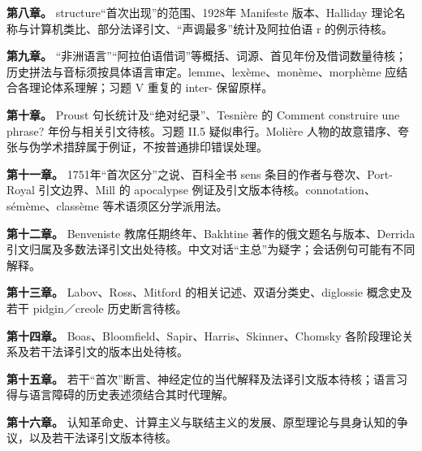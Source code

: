 \textbf{第八章。} structure“首次出现”的范围、1928年 Manifeste 版本、Halliday 理论名称与计算机类比、部分法译引文、“声调最多”统计及阿拉伯语 r 的例示待核。

\textbf{第九章。} “非洲语言”“阿拉伯语借词”等概括、词源、首见年份及借词数量待核；历史拼法与音标须按具体语言审定。lemme、lexème、monème、morphème 应结合各理论体系理解；习题 V 重复的 inter- 保留原样。

\textbf{第十章。} Proust 句长统计及“绝对纪录”、Tesnière 的 Comment construire une phrase? 年份与相关引文待核。习题 II.5 疑似串行。Molière 人物的故意错序、夸张与伪学术措辞属于例证，不按普通排印错误处理。

\textbf{第十一章。} 1751年“首次区分”之说、百科全书 sens 条目的作者与卷次、Port-Royal 引文边界、Mill 的 apocalypse 例证及引文版本待核。connotation、sémème、classème 等术语须区分学派用法。

\textbf{第十二章。} Benveniste 教席任期终年、Bakhtine 著作的俄文题名与版本、Derrida 引文归属及多数法译引文出处待核。中文对话“主总”为疑字；会话例句可能有不同解释。

\textbf{第十三章。} Labov、Ross、Mitford 的相关记述、双语分类史、diglossie 概念史及若干 pidgin／creole 历史断言待核。

\textbf{第十四章。} Boas、Bloomfield、Sapir、Harris、Skinner、Chomsky 各阶段理论关系及若干法译引文的版本出处待核。

\textbf{第十五章。} 若干“首次”断言、神经定位的当代解释及法译引文版本待核；语言习得与语言障碍的历史表述须结合其时代理解。

\textbf{第十六章。} 认知革命史、计算主义与联结主义的发展、原型理论与具身认知的争议，以及若干法译引文版本待核。
\endgroup
